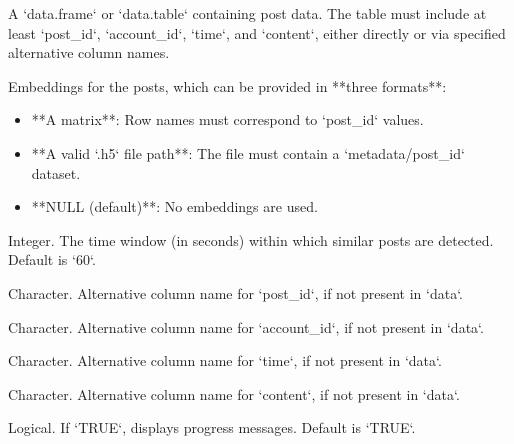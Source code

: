 \documentclass[a4paper]{book}
\begin{document}
\begin{Arguments}
\begin{ldescription}
\item[\code{data}] A `data.frame` or `data.table` containing post data. The table must include at least
`post\_id`, `account\_id`, `time`, and `content`, either directly or via specified alternative column names.

\item[\code{embeddings}] Embeddings for the posts, which can be provided in **three formats**:
\begin{itemize}

\item{} **A matrix**: Row names must correspond to `post\_id` values.
\item{} **A valid `.h5` file path**: The file must contain a `metadata/post\_id` dataset.
\item{} **NULL (default)**: No embeddings are used.

\end{itemize}


\item[\code{time\_window}] Integer. The time window (in seconds) within which similar posts are detected. Default is `60`.

\item[\code{post\_id}] Character. Alternative column name for `post\_id`, if not present in `data`.

\item[\code{account\_id}] Character. Alternative column name for `account\_id`, if not present in `data`.

\item[\code{time}] Character. Alternative column name for `time`, if not present in `data`.

\item[\code{content}] Character. Alternative column name for `content`, if not present in `data`.

\item[\code{verbose}] Logical. If `TRUE`, displays progress messages. Default is `TRUE`.
\end{ldescription}
\end{Arguments}
%
\end{document}
